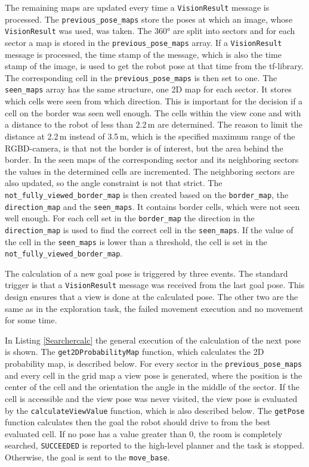 The remaining maps are updated every time a \texttt{VisionResult} message is processed. The \texttt{previous{\_}pose{\_}maps} store the poses at which an image, whose \texttt{VisionResult} was used, was taken. The 360° are split into sectors and for each sector a map is stored in the \texttt{previous{\_}pose{\_}maps} array. If a \texttt{VisionResult} message is processed, the time stamp of the message, which is also the time stamp of the image, is used to get the robot pose at that time from the tf-library. The corresponding cell in the \texttt{previous{\_}pose{\_}maps} is then set to one. The \texttt{seen{\_}maps} array has the same structure, one 2D map for each sector. It stores which cells were seen from which direction. This is important for the decision if a cell on the border was seen well enough. The cells within the view cone and with a distance to the robot of less than 2.2\,m are determined. The reason to limit the distance at 2.2\,m instead of 3.5\,m, which is the specified maximum range of the RGBD-camera, is that not the border is of interest, but the area behind the border. In the seen maps of the corresponding sector and its neighboring sectors the values in the determined cells are incremented. The neighboring sectors are also updated, so the angle constraint is not that strict. The \texttt{not{\_}fully{\_}viewed{\_}border{\_}map} is then created based on the \texttt{border{\_}map}, the \texttt{direction{\_}map} and the \texttt{seen{\_}maps}. It contains border cells, which were not seen well enough. For each cell set in the \texttt{border{\_}map} the direction in the \texttt{direction{\_}map} is used to find the correct cell in the \texttt{seen{\_}maps}. If the value of the cell in the \texttt{seen{\_}maps} is lower than a threshold, the cell is set in the \texttt{not{\_}fully{\_}viewed{\_}border{\_}map}.

The calculation of a new goal pose is triggered by three events. The standard trigger is that a \texttt{VisionResult} message was received from the last goal pose. This design ensures that a view is done at the calculated pose. The other two are the same as in the exploration task, the failed movement execution and no movement for some time. 

In Listing \ref{Searchercalc} the general execution of the calculation of the next pose is shown. The \texttt{get2DProbabilityMap} function, which calculates the 2D probability map, is described below. For every sector in the \texttt{previous{\_}pose{\_}maps} and every cell in the grid map a view pose is generated, where the position is the center of the cell and the orientation the angle in the middle of the sector. If the cell is accessible and the view pose was never visited, the view pose is evaluated by the \texttt{calculateViewValue} function, which is also described below. The \texttt{getPose} function calculates then the goal the robot should drive to from the best evaluated cell. If no pose has a value greater than 0, the room is completely searched, \texttt{SUCCEEDED} is reported to the high-level planner and the task is stopped. Otherwise, the goal is sent to the \texttt{move{\_}base}.

